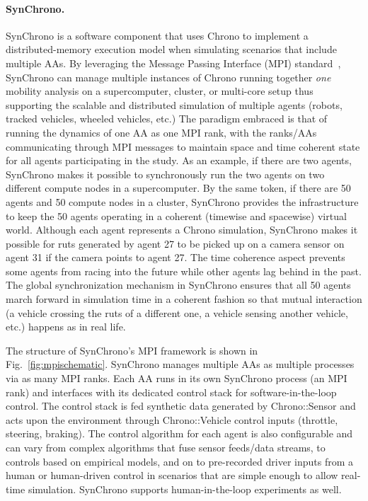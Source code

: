 \documentclass[12pt,twocolumn]{article}
\begin{document}
\paragraph{SynChrono.} SynChrono is a software component that uses Chrono to implement a distributed-memory execution model when simulating scenarios that include multiple AAs. By leveraging the Message Passing Interface (MPI) standard~\cite{mpi-3.0}, SynChrono can manage multiple instances of Chrono running together \textit{one} mobility analysis on a supercomputer, cluster, or multi-core setup thus supporting the scalable and distributed simulation of multiple agents (robots, tracked vehicles, wheeled vehicles, etc.) The paradigm embraced is that of running the dynamics of one AA as one MPI rank, with the ranks/AAs communicating through MPI messages to maintain space and time coherent state for all agents participating in the study. As an example, if there are two agents, SynChrono makes it possible to synchronously run the two agents on two different compute nodes in a supercomputer. By the same token, if there are 50 agents and 50 compute nodes in a cluster, SynChrono provides the infrastructure to keep the 50 agents operating in a coherent (timewise and spacewise) virtual world. Although each agent represents a Chrono simulation, SynChrono makes it possible for ruts generated by agent 27 to be picked up on a camera sensor on agent 31 if the camera points to agent 27. The time coherence aspect prevents some agents from racing into the future while other agents lag behind in the past. The global synchronization mechanism in SynChrono ensures that all 50 agents march forward in simulation time in a coherent fashion so that mutual interaction (a vehicle crossing the ruts of a different one, a vehicle sensing another vehicle, etc.) happens as in real life.

The structure of SynChrono's MPI framework is shown in Fig.~\ref{fig:mpischematic}. SynChrono manages multiple AAs as multiple processes via as many MPI ranks. Each AA runs in its own SynChrono process (an MPI rank) and interfaces with its dedicated control stack for software-in-the-loop control. The control stack is fed synthetic data generated by Chrono::Sensor and acts upon the environment through Chrono::Vehicle control inputs (throttle, steering, braking). The control algorithm for each agent is also configurable and can vary from complex algorithms that fuse sensor feeds/data streams, to controls based on empirical models, and on to pre-recorded driver inputs from a human or human-driven control in scenarios that are simple enough to allow real-time simulation. SynChrono supports human-in-the-loop experiments as well. 
\end{document}
